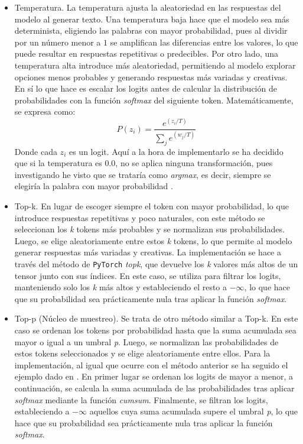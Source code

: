 \documentclass[11pt]{book}
\begin{document}
\begin{itemize}
    \item Temperatura.
La temperatura ajusta la aleatoriedad en las respuestas del modelo al generar texto. Una temperatura baja hace que el modelo sea más determinista, eligiendo las palabras con mayor probabilidad, pues al dividir por un número menor a $1$ se amplifican las diferencias entre los valores, lo que puede resultar en respuestas repetitivas o predecibles. Por otro lado, una temperatura alta introduce más aleatoriedad, permitiendo al modelo explorar opciones menos probables y generando respuestas más variadas y creativas. En sí lo que hace es escalar los logits antes de calcular la distribución de probabilidades con la función \textit{softmax} del siguiente token. Matemáticamente, se expresa como:
    \[
        P(z_i) = \frac{e^{(z_i / T)}}{\sum_{j} e^{(w_j/ T)}}
    \]
Donde cada $z_i$ es un logit. Aquí a la hora de implementarlo se ha decidido que si la temperatura es $0.0$, no se aplica ninguna transformación, pues investigando he visto que se trataría como \textit{argmax}, es decir, siempre se elegiría la palabra con mayor probabilidad \parencite{vishnuraj2025temperature}.

    \item Top-k.
En lugar de escoger siempre el token con mayor probabilidad, lo que introduce respuestas repetitivas y poco naturales, con este método se seleccionan los \textit{k} tokens más probables y se normalizan sus probabilidades. Luego, se elige aleatoriamente entre estos \textit{k} tokens, lo que permite al modelo generar respuestas más variadas y creativas. La implementación se hace a través del método de \texttt{PyTorch} \textit{topk}, que devuelve los \textit{k} valores más altos de un tensor junto con sus índices. En este caso, se utiliza para filtrar los logits, manteniendo solo los \textit{k} más altos y estableciendo el resto a $-\infty$, lo que hace que su probabilidad sea prácticamente nula tras aplicar la función \textit{softmax}.

    \item Top-p (Núcleo de muestreo).
Se trata de otro método similar a Top-k. En este caso se ordenan los tokens por probabilidad hasta que la suma acumulada sea mayor o igual a un umbral \textit{p}. Luego, se normalizan las probabilidades de estos tokens seleccionados y se elige aleatoriamente entre ellos. Para la implementación, al igual que ocurre con el método anterior se ha seguido el ejemplo dado en \parencite{bsantraigi_topk_topp_batched}. En primer lugar se ordenan los logits de mayor a menor, a continuación, se calcula la suma acumulada de las probabilidades tras aplicar \textit{softmax} mediante la función \textit{cumsum}. Finalmente, se filtran los logits, estableciendo a $-\infty$ aquellos cuya suma acumulada supere el umbral \textit{p}, lo que hace que su probabilidad sea prácticamente nula tras aplicar la función \textit{softmax}.


\end{itemize}
\end{document}
